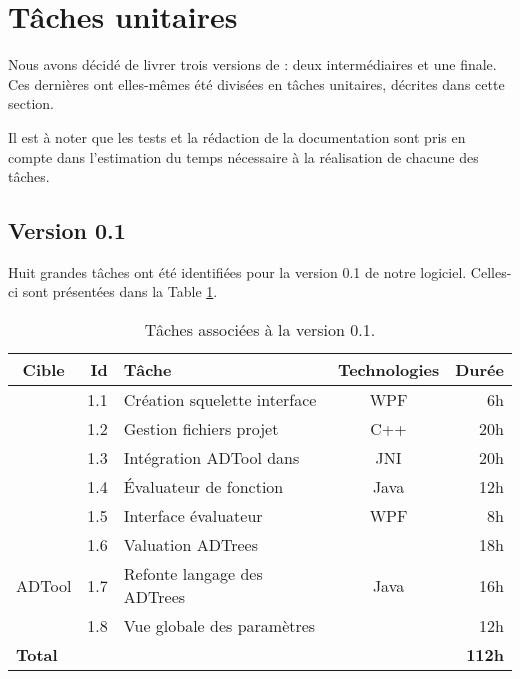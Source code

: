 \section{Tâches unitaires}
	\label{sec:taches_unitaires}

	Nous avons décidé de livrer trois versions de \glasir{} : deux intermédiaires et une finale. Ces dernières ont elles-mêmes été divisées en tâches unitaires, décrites dans cette section. 
	
	Il est à noter que les tests et la rédaction de la documentation sont pris en compte dans l'estimation du temps nécessaire à la réalisation de chacune des tâches.
	

	\subsection{Version 0.1}
		Huit grandes tâches ont été identifiées pour la version 0.1 de notre logiciel. Celles-ci sont présentées dans la {\sc Table} \ref{tab:taches_units_1}. 
		\begin{table}[H]
			\centering
			\begin{tabular}{|c|r|l|c|r|}
				\hline
				\textbf{Cible} & \textbf{Id} & \textbf{Tâche} & \textbf{Technologies} & \textbf{Durée}\\
				\hline

				\multirow{5}{*}{\glasir{}} & 1.1 & Création squelette interface & WPF & 6h\\
				\cline{2-5}
				 & 1.2 & Gestion fichiers projet & C++ & 20h\\
				\cline{2-5}
				 & 1.3 & Intégration ADTool dans \glasir & JNI & 20h\\
				\cline{2-5}
				 & 1.4 & \'Evaluateur de fonction & Java & 12h\\
				\cline{2-5}
				 & 1.5 & Interface évaluateur & WPF & 8h\\
				\hline

				\multirow{3}{*}{ADTool} & 1.6 & Valuation ADTrees & \multirow{3}{*}{Java} & 18h\\
				\cline{2-3} \cline{5-5}
				 & 1.7 & Refonte langage des ADTrees & & 16h\\
				\cline{2-3} \cline{5-5}
				 & 1.8 & Vue globale des paramètres & & 12h\\
				\hline

				\multicolumn{4}{|l|}{\bf Total} & {\bf 112h}\\
				\hline
			\end{tabular}
			\caption{Tâches associées à la version 0.1.}
			\label{tab:taches_units_1}
		\end{table}
		
